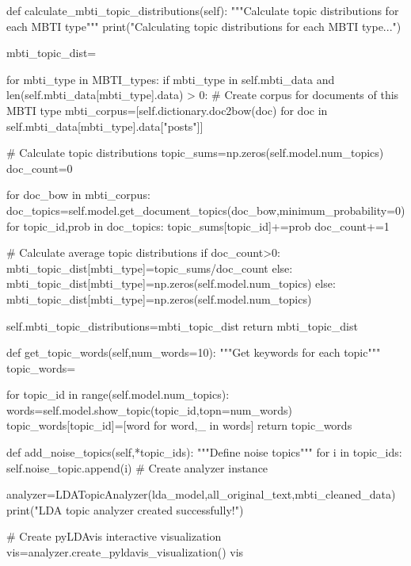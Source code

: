 \documentclass[12pt]{article}
\begin{document}
\begin{python}
    def calculate_mbti_topic_distributions(self):
        """Calculate topic distributions for each MBTI type"""
        print("Calculating topic distributions for each MBTI type...")
        
        mbti_topic_dist={}
        
        for mbti_type in MBTI_types:
            if mbti_type in self.mbti_data and len(self.mbti_data[mbti_type].data) > 0:
                # Create corpus for documents of this MBTI type
                mbti_corpus=[self.dictionary.doc2bow(doc) for doc in self.mbti_data[mbti_type].data["posts"]]
                
                # Calculate topic distributions
                topic_sums=np.zeros(self.model.num_topics)
                doc_count=0
                
                for doc_bow in mbti_corpus:
                    doc_topics=self.model.get_document_topics(doc_bow,minimum_probability=0)
                    for topic_id,prob in doc_topics:
                        topic_sums[topic_id]+=prob
                    doc_count+=1
                
                # Calculate average topic distributions
                if doc_count>0:
                    mbti_topic_dist[mbti_type]=topic_sums/doc_count
                else:
                    mbti_topic_dist[mbti_type]=np.zeros(self.model.num_topics)
            else:
                mbti_topic_dist[mbti_type]=np.zeros(self.model.num_topics)
        
        self.mbti_topic_distributions=mbti_topic_dist
        return mbti_topic_dist
    
    def get_topic_words(self,num_words=10):
        """Get keywords for each topic"""
        topic_words={}

        for topic_id in range(self.model.num_topics):
            words=self.model.show_topic(topic_id,topn=num_words)
            topic_words[topic_id]=[word for word,_ in words]
        return topic_words
    
    def add_noise_topics(self,*topic_ids):
        """Define noise topics"""
        for i in topic_ids:
            self.noise_topic.append(i)
# Create analyzer instance

analyzer=LDATopicAnalyzer(lda_model,all_original_text,mbti_cleaned_data)
print("LDA topic analyzer created successfully!")

# Create pyLDAvis interactive visualization
vis=analyzer.create_pyldavis_visualization()
vis
	\end{python}
\end{document}

